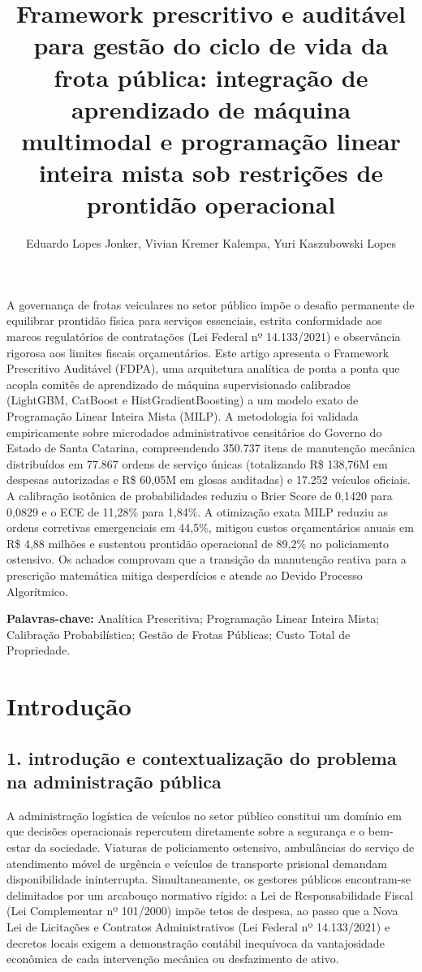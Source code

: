 \documentclass[12pt,a4paper]{article}
\title{\textbf{Framework prescritivo e auditável para gestão do ciclo de vida da frota pública: integração de aprendizado de máquina multimodal e programação linear inteira mista sob restrições de prontidão operacional}}
\author{Eduardo Lopes Jonker\inst{1}, Vivian Kremer Kalempa\inst{1}, Yuri Kaszubowski Lopes\inst{1}}
\begin{document}
\maketitle

\begin{resumo}
A governança de frotas veiculares no setor público impõe o desafio permanente de equilibrar prontidão física para serviços essenciais, estrita conformidade aos marcos regulatórios de contratações (Lei Federal nº 14.133/2021) e observância rigorosa aos limites fiscais orçamentários. Este artigo apresenta o Framework Prescritivo Auditável (FDPA), uma arquitetura analítica de ponta a ponta que acopla comitês de aprendizado de máquina supervisionado calibrados (LightGBM, CatBoost e HistGradientBoosting) a um modelo exato de Programação Linear Inteira Mista (MILP). A metodologia foi validada empiricamente sobre microdados administrativos censitários do Governo do Estado de Santa Catarina, compreendendo 350.737 itens de manutenção mecânica distribuídos em 77.867 ordens de serviço únicas (totalizando R\$ 138,76M em despesas autorizadas e R\$ 60,05M em glosas auditadas) e 17.252 veículos oficiais. A calibração isotônica de probabilidades reduziu o Brier Score de 0,1420 para 0,0829 e o ECE de 11,28\% para 1,84\%. A otimização exata MILP reduziu as ordens corretivas emergenciais em 44,5\%, mitigou custos orçamentários anuais em R\$ 4,88 milhões e sustentou prontidão operacional de 89,2\% no policiamento ostensivo. Os achados comprovam que a transição da manutenção reativa para a prescrição matemática mitiga desperdícios e atende ao Devido Processo Algorítmico.

\vspace{0.2cm}
\noindent\textbf{Palavras-chave:} Analítica Prescritiva; Programação Linear Inteira Mista; Calibração Probabilística; Gestão de Frotas Públicas; Custo Total de Propriedade.
\end{resumo}



\section{Introdução}


\subsection{1. introdução e contextualização do problema na administração pública}

A administração logística de veículos no setor público constitui um domínio em que decisões operacionais repercutem diretamente sobre a segurança e o bem-estar da sociedade. Viaturas de policiamento ostensivo, ambulâncias do serviço de atendimento móvel de urgência e veículos de transporte prisional demandam disponibilidade ininterrupta. Simultaneamente, os gestores públicos encontram-se delimitados por um arcabouço normativo rígido: a Lei de Responsabilidade Fiscal (Lei Complementar nº 101/2000) impõe tetos de despesa, ao passo que a Nova Lei de Licitações e Contratos Administrativos (Lei Federal nº 14.133/2021) e decretos locais exigem a demonstração contábil inequívoca da vantajosidade econômica de cada intervenção mecânica ou desfazimento de ativo.
\end{document}
